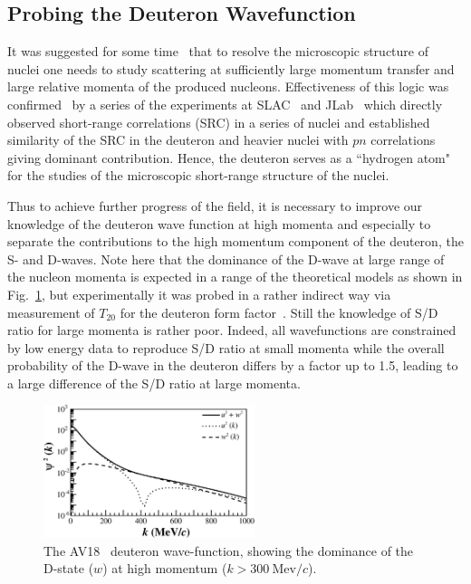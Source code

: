 \subsection{Probing the Deuteron Wavefunction}

It was suggested for some time~\cite{Frankfurt:1981mk} that to resolve the microscopic structure of nuclei one needs to study scattering at sufficiently large momentum transfer and large relative momenta of the produced nucleons. Effectiveness of this logic was confirmed~\cite{Arrington:2011xs} by a series of the experiments at SLAC~\cite{Frankfurt:1993sp} and JLab~\cite{Arrington:1998ps,Fomin:2011ng} which directly observed short-range correlations (SRC) in a series of nuclei and established similarity of the SRC in the deuteron and heavier nuclei with $pn$ correlations giving dominant contribution.  Hence, the deuteron serves as a ``hydrogen atom" for the studies of the microscopic short-range structure  of the nuclei.

Thus to achieve further progress of the field, it is necessary to improve our knowledge of the deuteron wave function at high momenta and especially to separate the contributions to the high momentum component of the deuteron, the S- and D-waves. Note here that the dominance of the D-wave at large range of the nucleon momenta is expected in a range of the theoretical models as shown in Fig.~\ref{sd-wf}, but experimentally it was probed in a rather indirect way via measurement of $T_{20}$ for the deuteron form factor~\cite{Garcon:2001sz}. Still the knowledge of S/D ratio for large momenta is rather poor. Indeed, all wavefunctions are constrained by low energy data to reproduce S/D ratio at small momenta while the overall probability of the D-wave in the deuteron differs by a factor up to 1.5, leading to a large difference of the S/D ratio at large momenta.

\begin{figure}
\begin{center}
\includegraphics[width=0.55\textwidth]{figs/sd_wf_av18.eps}
\caption{\label{sd-wf} The AV18~\cite{PhysRevC.84.034003} deuteron wave-function, showing the dominance of the D-state ($w$) at high momentum ($k>300\mathrm{~Mev}/c$).}
\end{center}
\end{figure}

